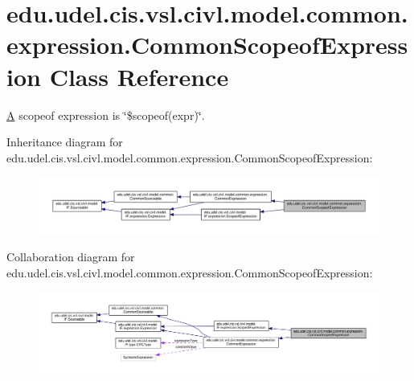 \hypertarget{classedu_1_1udel_1_1cis_1_1vsl_1_1civl_1_1model_1_1common_1_1expression_1_1CommonScopeofExpression}{}\section{edu.\+udel.\+cis.\+vsl.\+civl.\+model.\+common.\+expression.\+Common\+Scopeof\+Expression Class Reference}
\label{classedu_1_1udel_1_1cis_1_1vsl_1_1civl_1_1model_1_1common_1_1expression_1_1CommonScopeofExpression}


\hyperlink{structA}{A} scopeof expression is \char`\"{}\$scopeof(expr)\char`\"{}.  




Inheritance diagram for edu.\+udel.\+cis.\+vsl.\+civl.\+model.\+common.\+expression.\+Common\+Scopeof\+Expression\+:
\nopagebreak
\begin{figure}[H]
\begin{center}
\leavevmode
\includegraphics[width=350pt]{classedu_1_1udel_1_1cis_1_1vsl_1_1civl_1_1model_1_1common_1_1expression_1_1CommonScopeofExpression__inherit__graph}
\end{center}
\end{figure}


Collaboration diagram for edu.\+udel.\+cis.\+vsl.\+civl.\+model.\+common.\+expression.\+Common\+Scopeof\+Expression\+:
\nopagebreak
\begin{figure}[H]
\begin{center}
\leavevmode
\includegraphics[width=350pt]{classedu_1_1udel_1_1cis_1_1vsl_1_1civl_1_1model_1_1common_1_1expression_1_1CommonScopeofExpression__coll__graph}
\end{center}
\end{figure}
